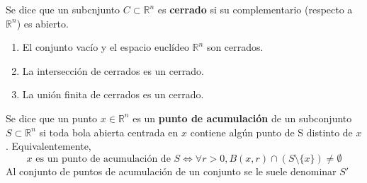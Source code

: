 \begin{definición}
    Se dice que un subcnjunto $C \subset \mathbb{R}^n$ es \textbf{cerrado} si su complementario (respecto a $\mathbb{R}^n$) es abierto. 
\end{definición}
\begin{proposición}
    \begin{enumerate}
        \item El conjunto vacío y el espacio euclídeo $\mathbb{R}^n$ son cerrados.
        \item La intersección de cerrados es un cerrado.
        \item La unión finita de cerrados es un cerrado.
    \end{enumerate}
\end{proposición}
\begin{definición}
    Se dice que un punto $x \in \mathbb{R}^n$ es un \textbf{punto de acumulación} de un subconjunto $S \subset \mathbb{R}^n$ si toda bola abierta centrada en $x$ contiene algún punto de S distinto de $x$. Equivalentemente, 
    $$x \text{ es un punto de acumulación de } S \Leftrightarrow \forall r > 0, B(x, r) \cap (S \setminus \{x\}) \neq \emptyset$$
    Al conjunto de puntos de acumulación de un conjunto se le suele denominar $S \prime$ 
\end{definición}

